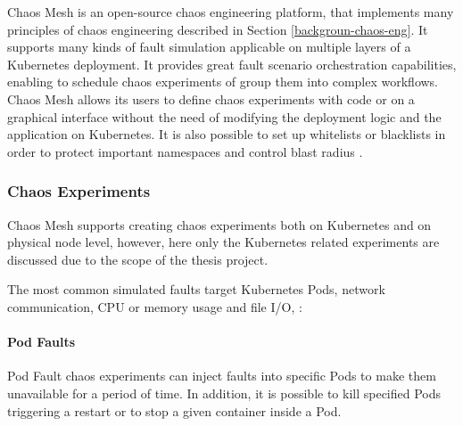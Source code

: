 Chaos Mesh is an open-source chaos engineering platform, that implements many principles of chaos engineering described in Section \ref{backgroun-chaos-eng}. It supports many kinds of fault simulation applicable on multiple layers of a Kubernetes deployment. It provides great fault scenario orchestration capabilities, enabling to schedule chaos experiments of group them into complex workflows. Chaos Mesh allows its users to define chaos experiments with code or on a graphical interface without the need of modifying the deployment logic and the application on Kubernetes. It is also possible to set up whitelists or blacklists in order to protect important namespaces and control blast radius \cite{ChaosMesh}. 

%	

\subsubsection{Chaos Experiments}

Chaos Mesh supports creating chaos experiments both on Kubernetes and on physical node level, however, here only the Kubernetes related experiments are discussed due to the scope of the thesis project.

The most common simulated faults target Kubernetes Pods, network communication, CPU or memory usage and file I/O, \etc \cite{ChaosMesh}:

\paragraph{Pod Faults} Pod Fault chaos experiments can inject faults into specific Pods to make them unavailable for a period of time. In addition, it is possible to kill specified Pods triggering a restart or to stop a given container inside a Pod.

